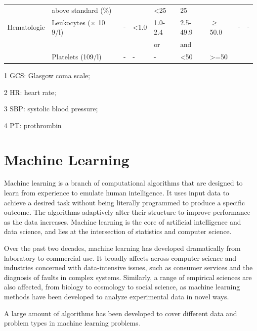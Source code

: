 \documentclass[12pt,a4paper,english
]{tunithesis}
\begin{document}
\begin{landscape}
\begin{table}[]
\begin{threeparttable}
\begin{tabular}{lllllllll}
             & above standard (\%) &  &  & \textless{}25 & 25 &  &  &  \\
            Hematologic & Leukocytes (× 10 9/l) & - & \textless{}1.0 & 1.0-2.4 & 2.5-49.9 & $\geq$50.0 & - & - \\
             &  &  &  & or & and &  &  &  \\
             & Platelets (109/l) & - & - & - & \textless{}50 & \textgreater{}=50 &  &  \\
             \hline
        \end{tabular}
        \begin{tablenotes}
            \item[1] GCS: Glasgow coma scale; 
            \item[2] HR: heart rate; 
            \item[3] SBP: systolic blood pressure;        
            \item[4] PT: prothrombin
        \end{tablenotes}
        \end{threeparttable}
    \end{table}
\end{landscape}


\section{Machine Learning}
Machine learning is a branch of computational algorithms that are designed to learn from experience to emulate human intelligence. \parencite{elnaqa2015} It uses input data to achieve a desired task without being literally programmed to produce a specific outcome. The algorithms adaptively alter their structure to improve performance as the data increases. Machine learning is the core of artificial intelligence and data science, and lies at the intersection of statistics and computer science. \parencite{jorden2015} 

Over the past two decades, machine learning has developed dramatically from laboratory to commercial use. It broadly affects across computer science and industries concerned with data-intensive issues, such as consumer services and the diagnosis of faults in complex systems. Similarly, a range of empirical sciences are also affected, from biology to cosmology to social science, as machine learning methods have been developed to analyze experimental data in novel ways. \parencite{jorden2015}

A large amount of algorithms has been developed to cover different data and problem types in machine learning problems.
\end{document}
